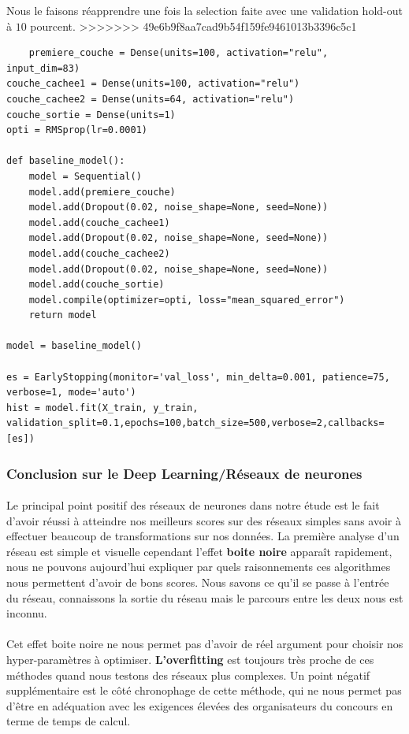 \documentclass[14pt, openany]{article}
\begin{document}
Nous le faisons réapprendre une fois la selection faite avec une validation hold-out à $10$ pourcent.
>>>>>>> 49e6b9f8aa7cad9b54f159fe9461013b3396c5c1

\begin{verbatim}
    premiere_couche = Dense(units=100, activation="relu", input_dim=83)
couche_cachee1 = Dense(units=100, activation="relu")
couche_cachee2 = Dense(units=64, activation="relu")
couche_sortie = Dense(units=1)
opti = RMSprop(lr=0.0001)

def baseline_model():
    model = Sequential()
    model.add(premiere_couche)
    model.add(Dropout(0.02, noise_shape=None, seed=None))
    model.add(couche_cachee1)
    model.add(Dropout(0.02, noise_shape=None, seed=None))
    model.add(couche_cachee2)
    model.add(Dropout(0.02, noise_shape=None, seed=None))
    model.add(couche_sortie)
    model.compile(optimizer=opti, loss="mean_squared_error")
    return model

model = baseline_model()

es = EarlyStopping(monitor='val_loss', min_delta=0.001, patience=75, verbose=1, mode='auto')
hist = model.fit(X_train, y_train, validation_split=0.1,epochs=100,batch_size=500,verbose=2,callbacks=[es])
\end{verbatim}

\subsubsection{Conclusion sur le Deep Learning/Réseaux de neurones}
\paragraph{}
Le principal point positif des réseaux de neurones dans notre étude est le fait d'avoir réussi à atteindre nos meilleurs scores sur des réseaux simples sans avoir à effectuer beaucoup de transformations sur nos données. La première analyse d'un réseau est simple et visuelle cependant l'effet \textbf{boite noire} apparaît rapidement, nous ne pouvons aujourd'hui expliquer par quels raisonnements ces algorithmes nous permettent d'avoir de bons scores. Nous savons ce qu'il se passe à l'entrée du réseau, connaissons la sortie du réseau mais le parcours entre les deux nous est inconnu.

\paragraph{}
Cet effet boite noire ne nous permet pas d'avoir de réel argument pour choisir nos hyper-paramètres à optimiser. \textbf{L'overfitting} est toujours très proche de ces méthodes quand nous testons des réseaux plus complexes. Un point négatif supplémentaire est le côté \og chronophage \fg{} de cette méthode, qui ne nous permet pas d'être en adéquation avec les exigences élevées des organisateurs du concours en terme de temps de calcul.
\end{document}
